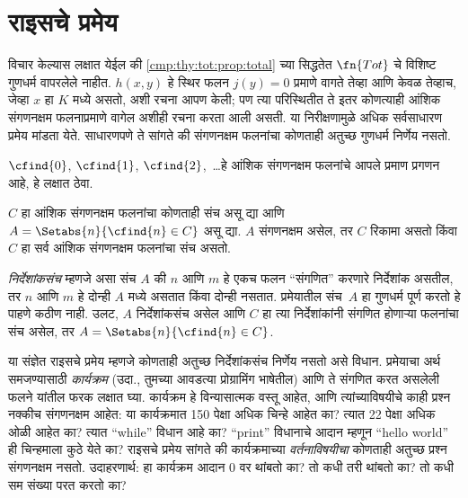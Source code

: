 \section{राइसचे प्रमेय}\label{cmp:thy:rce:sec}

विचार केल्यास लक्षात येईल की \ref{cmp:thy:tot:prop:total}
च्या सिद्धतेत $\fn{Tot}$ चे विशिष्ट गुणधर्म वापरलेले नाहीत.
$h(x,y)$ हे स्थिर फलन $j(y) = 0$ प्रमाणे वागते तेव्हा आणि केवळ
तेव्हाच, जेव्हा $x$ हा $K$ मध्ये असतो, अशी रचना आपण केली; पण त्या
परिस्थितीत ते इतर कोणत्याही आंशिक संगणनक्षम फलनाप्रमाणे
वागेल अशीही रचना करता आली असती. या निरीक्षणामुळे अधिक
सर्वसाधारण प्रमेय मांडता येते. साधारणपणे ते सांगते की
संगणनक्षम फलनांचा कोणताही अतुच्छ गुणधर्म निर्णेय नसतो.

$\cfind{0}$, $\cfind{1}$, $\cfind{2}$,~\dots हे आंशिक
संगणनक्षम फलनांचे आपले प्रमाण प्रगणन आहे, हे लक्षात ठेवा.

\begin{thm}[राइसचे प्रमेय]
  $C$ हा आंशिक संगणनक्षम फलनांचा कोणताही संच असू द्या आणि $A =
  \Setabs{n}{\cfind{n} \in C}$ असू द्या. $A$ संगणनक्षम असेल,
  तर $C$ रिकामा असतो किंवा $C$ हा सर्व आंशिक संगणनक्षम
  फलनांचा संच असतो.
\end{thm}

{\em निर्देशांकसंच} म्हणजे असा संच $A$ की $n$ आणि $m$ हे
एकच फलन ``संगणित'' करणारे निर्देशांक असतील, तर $n$ आणि
$m$ हे दोन्ही $A$ मध्ये असतात किंवा दोन्ही नसतात. प्रमेयातील संच~$A$
हा गुणधर्म पूर्ण करतो हे पाहणे कठीण नाही. उलट, $A$
निर्देशांकसंच असेल आणि $C$ हा त्या निर्देशांकांनी संगणित
होणाऱ्या फलनांचा संच असेल, तर $A = \Setabs{n}{\cfind{n} \in C}$.

\begin{explain}
या संज्ञेत राइसचे प्रमेय म्हणजे कोणताही अतुच्छ निर्देशांकसंच
निर्णेय नसतो असे विधान. प्रमेयाचा अर्थ समजण्यासाठी
\emph{कार्यक्रम} (उदा., तुमच्या आवडत्या प्रोग्रामिंग भाषेतील)
आणि ते संगणित करत असलेली फलने यांतील फरक लक्षात घ्या.
कार्यक्रम हे विन्यासात्मक वस्तू आहेत, आणि त्यांच्याविषयीचे
काही प्रश्न नक्कीच संगणनक्षम आहेत: या कार्यक्रमात 150
पेक्षा अधिक चिन्हे आहेत का? त्यात 22 पेक्षा अधिक ओळी
आहेत का? त्यात ``while'' विधान आहे का? ``print'' विधानाचे
आदान म्हणून ``hello world'' ही चिन्हमाला कुठे येते का?
राइसचे प्रमेय सांगते की कार्यक्रमाच्या \emph{वर्तनाविषयीचा}
कोणताही अतुच्छ प्रश्न संगणनक्षम नसतो. उदाहरणार्थ: हा
कार्यक्रम आदान $0$ वर थांबतो का? तो कधी तरी थांबतो का?
तो कधी सम संख्या परत करतो का?
\end{explain}

